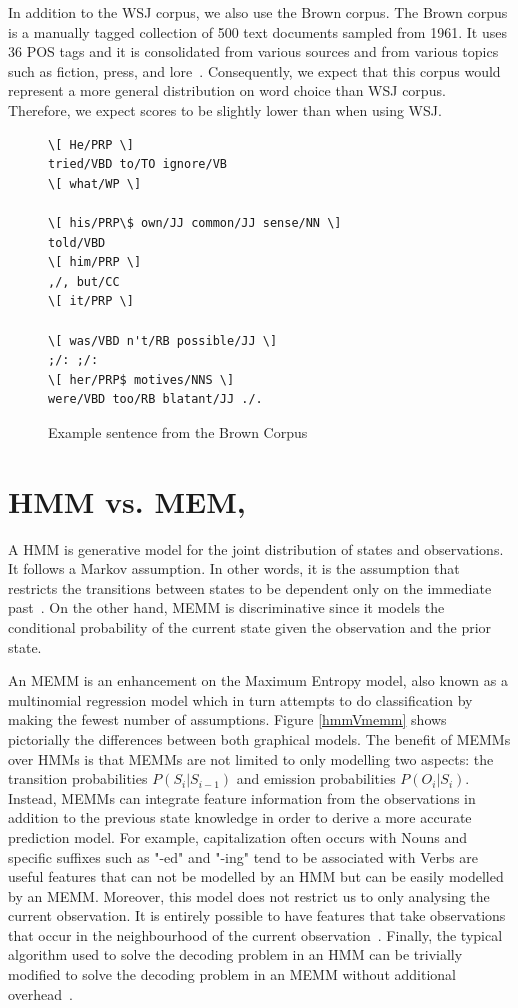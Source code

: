 \documentclass{acm_proc_article-sp}
\begin{document}
In addition to the WSJ corpus, we also use the Brown corpus. The Brown corpus is a manually tagged collection of 500 text documents sampled from 1961. It uses 36 POS tags and it is consolidated from various sources and from various topics such as fiction, press, and lore~\cite{brownCorpus}. Consequently, we expect that this corpus would represent a more general distribution on word choice than WSJ corpus. Therefore, we expect scores to be slightly lower than when using WSJ.

\begin{figure}[ht]
 \begin{Verbatim}[frame=single,framesep=5mm]
\[ He/PRP \]
tried/VBD to/TO ignore/VB 
\[ what/WP \]

\[ his/PRP\$ own/JJ common/JJ sense/NN \]
told/VBD 
\[ him/PRP \]
,/, but/CC 
\[ it/PRP \]

\[ was/VBD n't/RB possible/JJ \]
;/: ;/: 
\[ her/PRP$ motives/NNS \]
were/VBD too/RB blatant/JJ ./.
\end{Verbatim}
\caption{Example sentence from the Brown Corpus~\cite{brownCorpus} \label{brownExample}}
\end{figure}

\section{HMM vs. MEM,}
A HMM is generative model for the joint distribution of states and observations. It follows a Markov assumption. In other words, it is the assumption that restricts the transitions between states to be dependent only on the immediate past~\cite{nlpBook}. On the other hand, MEMM is discriminative since it models the conditional probability of the current state given the observation and the prior state. 

An MEMM is an enhancement on the Maximum Entropy model, also known as a multinomial regression model which in turn attempts to do classification by making the fewest number of assumptions. Figure \ref{hmmVmemm} shows pictorially the differences between both graphical models. The benefit of MEMMs over HMMs is that MEMMs are not limited to only modelling two aspects: the transition probabilities $P( S_i | S_{i-1} )$ and emission probabilities $P( O_i | S_i )$. Instead, MEMMs can integrate feature information from the observations in addition to the previous state knowledge in order to derive a more accurate prediction model. For example, capitalization often occurs with Nouns and specific suffixes such as "-ed" and "-ing" tend to be associated with Verbs are useful features that can not be modelled by an HMM but can be easily modelled by an MEMM. Moreover, this model does not restrict us to only analysing the current observation. It is entirely possible to have features that take observations that occur in the neighbourhood of the current observation~\cite{nlpBook}. Finally, the typical algorithm used to solve the decoding problem in an HMM can be trivially modified to solve the decoding problem in an MEMM without additional overhead~\cite{memmPaper}.
\end{document}
